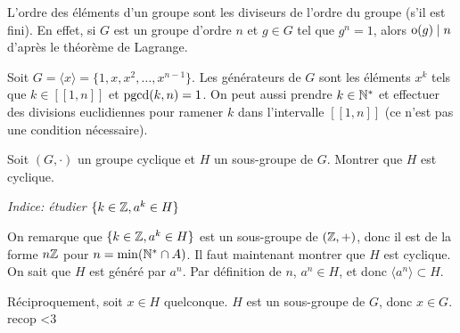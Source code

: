 \documentclass[11pt,a4paper]{report}
\begin{document}
\begin{remark}
    L'ordre des éléments d'un groupe sont les diviseurs de l'ordre du groupe (s'il est fini). En effet, si $G$ est un groupe d'ordre $n$ et $g \in G$ tel que $g^n = 1$, alors $\mathrm{o}(g) \mid n$ d'après le théorème de Lagrange.
\end{remark}

\begin{property}
    Soit $G = \langle x \rangle = \{1,x,x^2,\ldots,x^{n-1}\}$. Les générateurs de $G$ sont les éléments $x^k$ tels que $k \in [\![1,n]\!]$ et $\mathrm{pgcd}(k,n) = 1$. On peut aussi prendre $k \in \mathbb{N}^*$ et effectuer des divisions euclidiennes pour ramener $k$ dans l'intervalle $[\![1,n]\!]$ (ce n'est pas une condition nécessaire).
\end{property}

\begin{exercise}
    Soit $(G,\cdot)$ un groupe cyclique et $H$ un sous-groupe de $G$. Montrer que $H$ est cyclique.


    \textit{Indice: étudier $\{k \in \mathbb{Z}, a^k \in H\}$}
\end{exercise}

\begin{correction}
    On remarque que $\{k \in \mathbb{Z}, a^k \in H\}$ est un sous-groupe de $(\mathbb{Z},+)$, donc il est de la forme $n\mathbb{Z}$ pour $n=\min(\mathbb{N}^* \cap A)$. Il faut maintenant montrer que $H$ est cyclique. On sait que $H$ est généré par $a^n$. Par définition de $n$, $a^n \in H$, et donc $\langle a^n \rangle \subset H$. 
    
    Réciproquement, soit $x \in H$ quelconque. $H$ est un sous-groupe de $G$, donc $x \in G$. recop <3
\end{correction}

\end{document}
